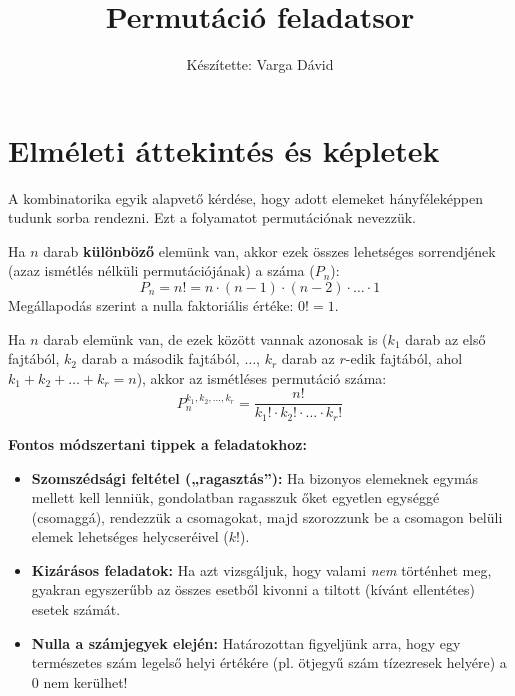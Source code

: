 \documentclass[12pt,a4paper]{article}
\title{Permutáció feladatsor}
\author{Készítette: Varga Dávid}
\date{}
\begin{document}
\maketitle

\section*{Elméleti áttekintés és képletek}

A kombinatorika egyik alapvető kérdése, hogy adott elemeket hányféleképpen tudunk sorba rendezni. Ezt a folyamatot permutációnak nevezzük.

\begin{tcolorbox}[colback=gray!5!white,colframe=gray!40!black,title=1. Ismétlés nélküli permutáció, fonttitle=\bfseries, arc=2mm, boxrule=0.5mm]
Ha $n$ darab \textbf{különböző} elemünk van, akkor ezek összes lehetséges sorrendjének (azaz ismétlés nélküli permutációjának) a száma ($P_n$):
\begin{equation*}
    P_n = n! = n \cdot (n - 1) \cdot (n - 2) \cdot \dots \cdot 1
\end{equation*}
Megállapodás szerint a nulla faktoriális értéke: $0! = 1$.
\end{tcolorbox}

\begin{tcolorbox}[colback=gray!5!white,colframe=gray!40!black,title=2. Ismétléses permutáció, fonttitle=\bfseries, arc=2mm, boxrule=0.5mm]
Ha $n$ darab elemünk van, de ezek között vannak azonosak is ($k_1$ darab az első fajtából, $k_2$ darab a második fajtából, $\dots$, $k_r$ darab az $r$-edik fajtából, ahol $k_1 + k_2 + \dots + k_r = n$), akkor az ismétléses permutáció száma:
\begin{equation}
    P_n^{k_1, k_2, \dots, k_r} = \frac{n!}{k_1! \cdot k_2! \cdot \dots \cdot k_r!}
\end{equation}
\end{tcolorbox}

\vspace{0.3cm}
\noindent\textbf{Fontos módszertani tippek a feladatokhoz:}
\begin{itemize}
    \item \textbf{Szomszédsági feltétel („ragasztás”):} Ha bizonyos elemeknek egymás mellett kell lenniük, gondolatban ragasszuk őket egyetlen egységgé (csomaggá), rendezzük a csomagokat, majd szorozzunk be a csomagon belüli elemek lehetséges helycseréivel ($k!$).
    \item \textbf{Kizárásos feladatok:} Ha azt vizsgáljuk, hogy valami \emph{nem} történhet meg, gyakran egyszerűbb az összes esetből kivonni a tiltott (kívánt ellentétes) esetek számát.
    \item \textbf{Nulla a számjegyek elején:} Határozottan figyeljünk arra, hogy egy természetes szám legelső helyi értékére (pl. ötjegyű szám tízezresek helyére) a $0$ nem kerülhet!
\end{itemize}
\end{document}
